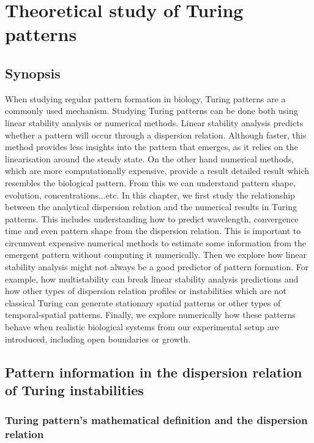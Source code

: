 \chapter{Theoretical study of Turing patterns }
\section{Synopsis}
When studying regular pattern formation in biology, Turing patterns are a commonly used mechanism.
Studying Turing patterns can be done both using linear stability analysis or numerical methods.
Linear stability analysis predicts whether a pattern will occur through a dispersion relation.
Although faster, this method provides less insights into the pattern that emerges, as it relies on the linearisation around the steady state.
On the other hand numerical methods, which are more computationally expensive, provide a result detailed result which resembles the biological pattern. From this we can understand pattern shape, evolution, concentrations...etc.
In this chapter, we first study the relationship between the analytical dispersion relation and the numerical results in Turing patterns.
This includes understanding how to predict wavelength,
convergence time and even pattern shape from the dispersion relation.
This is important to circumvent expensive numerical methods to estimate some information from the emergent pattern without computing it numerically.
Then we explore how linear stability analysis might not always be a good predictor of pattern formation.
For example, how multistability can break linear stability analysis predictions and how other types of dispersion relation profiles or instabilities which are not classical Turing can generate stationary spatial patterns or other types of temporal-spatial patterns.
Finally, we explore numerically how these patterns behave when realistic biological systems from our experimental setup are introduced, including open boundaries or growth.



\section{Pattern information in the dispersion relation of Turing instabilities}
\subsection{Turing pattern's mathematical definition and the dispersion relation}


